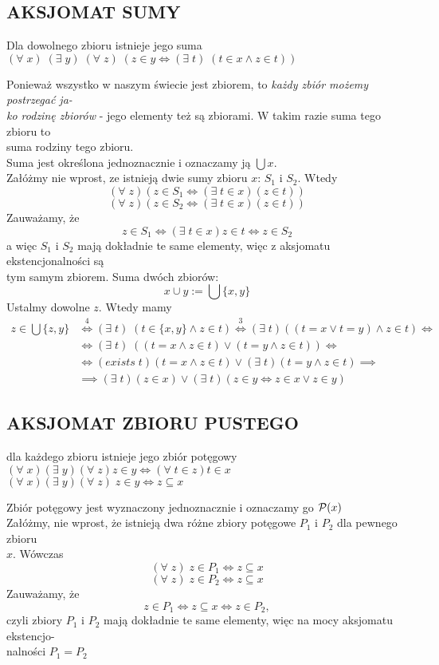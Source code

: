 \subsection{AKSJOMAT SUMY}
\begin{center}\large
    Dla dowolnego zbioru istnieje jego suma\smallskip\\
    $(\forall\;x)\;(\exists\;y)\;(\forall\;z)\;(z\in y\iff (\exists\;t)\;(t\in x\land z\in t))$
\end{center}\bigskip
Ponieważ wszystko w naszym świecie jest zbiorem, to \emph{\color{emp}każdy zbiór możemy postrzegać ja-\\ko rodzinę zbiorów} - jego elementy też są zbiorami. W takim razie suma tego zbioru to \\suma rodziny tego zbioru.\medskip\\
{\color{def}Suma jest określona jednoznacznie} i oznaczamy ją $\bigcup x$.\bigskip\\
\dowod
Załóżmy nie wprost, ze istnieją dwie sumy zbioru $x$: $S_1$ i $S_2$. Wtedy
$$(\forall\;z)(z\in S_1\iff (\exists\;t\in x) (z\in t))$$
$$(\forall\;z)(z\in S_2\iff (\exists\;t\in x) (z\in t))$$
Zauważamy, że
$$z\in S_1\iff (\exists\;t\in x)z\in t\iff z\in S_2$$
a więc $S_1$ i $S_2$ mają dokładnie te same elementy, więc z aksjomatu ekstencjonalności są \\tym samym zbiorem.
\kondow
Suma dwóch zbiorów:
$$x\cup y := \bigcup\{x, y\}$$
\dowod
Ustalmy dowolne $z$. Wtedy mamy
\begin{align*}
    z\in \bigcup\{z, y\}&\overset{4}\iff (\exists\;t)\;(t\in \{x, y\}\land z\in t)\overset{3}\iff (\exists\;t)((t=x\lor t=y)\land z\in t)\iff\\
    &\iff (\exists\;t)\;((t=x\land z\in t)\lor (t=y\land z\in t))\iff \\
    &\iff (exists\;t)(t=x\land z\in t)\lor(\exists\;t)(t=y\land z\in t)\implies\\
    &\implies (\exists\;t)(z\in x)\lor (\exists\;t)(z\in y\iff z\in x\lor z\in y)
\end{align*}
\kondow
\subsection{AKSJOMAT ZBIORU PUSTEGO}
\begin{center}\large
    dla każdego zbioru istnieje jego zbiór potęgowy\smallskip\\
    $(\forall\;x)(\exists\;y)(\forall\;z)z\in y\iff (\forall\;t\in z) t\in x$\smallskip\\
    $(\forall\;x)(\exists\;y)(\forall\;z) \;z\in y\iff z\subseteq x$
\end{center}\bigskip
Zbiór potęgowy jest wyznaczony jednoznacznie i oznaczamy go $\mathcal{P}(x)$\medskip\\
\dowod
Załóżmy, nie wprost, że istnieją dwa różne zbiory potęgowe $P_1$ i $P_2$ dla pewnego zbioru \\$x$. Wówczas
$$(\forall\;z)\;z\in P_1\iff z\subseteq x$$
$$(\forall\;z)\;z\in P_2\iff z\subseteq x$$
Zauważamy, że
$$z\in P_1\iff z\subseteq x\iff z\in P_2,$$
czyli zbiory $P_1$ i $P_2$ mają dokładnie te same elementy, więc na mocy aksjomatu ekstencjo-\\nalności $P_1=P_2$
\kondow
